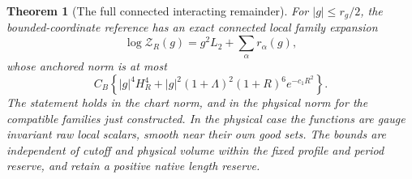 \documentclass[11pt,reqno]{amsart}
\numberwithin{equation}{section}
\newtheorem{theorem}{Theorem}[section]
\theoremstyle{definition}
\theoremstyle{remark}
\begin{document}
\begin{theorem}[The full connected interacting remainder]
\label{thm:connected-fourth-order}
For \(|g|\le r_g/2\), the bounded-coordinate
reference has an exact connected local
family expansion
\begin{equation}
        \log\mathcal Z_R(g)
                    =g^2L_2+\sum_\alpha r_\alpha(g),
 \label{eq:connected-full-reference-identity}
\end{equation}
whose anchored norm is at most
\begin{equation}
       C_B\left\{
          |g|^4H_R^4+
          |g|^2(1+\Lambda)^2(1+R)^6e^{-c_1R^2}
                                                        \right\}.
 \label{eq:connected-fourth-order-price}
\end{equation}
The statement holds in the chart norm,
and in the physical norm for the
compatible families just constructed.
In the physical case the functions
are gauge invariant raw local scalars,
smooth near their own good sets.
The bounds are independent of cutoff
and physical volume within the fixed
profile and period reserve, and retain
a positive native length reserve.
\end{theorem}
\end{document}
